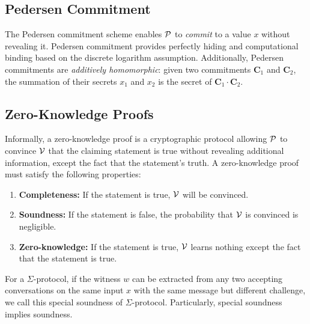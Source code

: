 \subsection{Pedersen Commitment}
\label{sec:pedersen}
The Pedersen commitment scheme \cite{pedersen} enables $\mathcal{P}$ to \textit{commit} to a value $x$ without revealing it. Pedersen commitment provides perfectly hiding and computational binding based on the discrete logarithm assumption. Additionally, Pedersen commitments are \textit{additively homomorphic}: given two commitments $\textbf{C}_1$ and $\textbf{C}_2$, the summation of their secrets $x_1$ and $x_2$ is the secret of $\textbf{C}_1\cdot\textbf{C}_2$.

\subsection{Zero-Knowledge Proofs}
Informally, a zero-knowledge proof is a cryptographic protocol allowing $\mathcal{P}$ to convince $\mathcal{V}$ that the claiming statement is true without revealing additional information, except the fact that the statement's truth. A zero-knowledge proof must satisfy the following properties:
\begin{enumerate}
    \item \textbf{Completeness:} If the statement is true, $\mathcal{V}$ will be convinced.
    \item \textbf{Soundness:} If the statement is false, the probability that $\mathcal{V}$ is convinced is negligible.
    \item \textbf{Zero-knowledge:} If the statement is true, $\mathcal{V}$ learns nothing except the fact that the statement is true.
\end{enumerate}

\begin{definition}
For a $\Sigma$-protocol, if the witness $w$ can be extracted from any two accepting conversations on the same input $x$ with the same message but different challenge, we call this special soundness of $\Sigma$-protocol. Particularly, special soundness implies soundness.
\end{definition}

